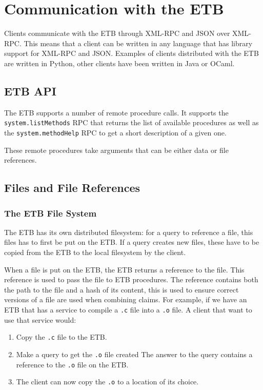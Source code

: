 \documentclass{article}
\begin{document}
\section{Communication with the ETB}

Clients communicate with the ETB through XML-RPC and JSON over
XML-RPC. This means that a client can be written in any language that
has library support for XML-RPC and JSON. Examples of clients
distributed with the ETB are written in Python, other clients have
been written in Java or OCaml.

\subsection{ETB API}

The ETB supports a number of remote procedure calls. It supports the
{\tt system.listMethods} RPC that returns the list of available
procedures as well as the {\tt system.methodHelp} RPC to get a short
description of a given one.

These remote procedures take arguments that can be either data or file
references.

\subsection{Files and File References}

\subsubsection{The ETB File System}

The ETB has its own distributed filesystem: for a query to reference a
file, this files has to first be put on the ETB. If a query creates
new files, these have to be copied from the ETB to the local
filesystem by the client.

When a file is put on the ETB, the ETB returns a reference to the
file. This reference is used to pass the file to ETB procedures. The
reference contains both the path to the file and a hash of its
content, this is used to ensure correct versions of a file are used
when combining claims. For example, if we have an ETB that has a
service to compile a {\tt .c} file into a {\tt .o} file. A client that
want to use that service would:
\begin{enumerate}
\item Copy the {\tt .c} file to the ETB.
\item Make a query to get the {\tt .o} file created The answer to the query
contains a reference to the {\tt .o} file on the ETB.
\item The client can now copy the {\tt .o} to a location of its
  choice.
\end{enumerate}
\end{document}
